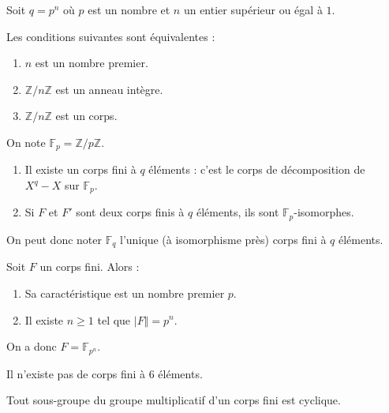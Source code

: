 	Soit $q = p^n$ où $p$ est un nombre et $n$ un entier supérieur ou égal à $1$.


	\begin{proposition}
		Les conditions suivantes sont équivalentes :
		\begin{enumerate}[label=(\roman*)]
			\item $n$ est un nombre premier.
			\item $\mathbb{Z}/n\mathbb{Z}$ est un anneau intègre.
			\item $\mathbb{Z}/n\mathbb{Z}$ est un corps.
		\end{enumerate}
	\end{proposition}

	\begin{notation}
		On note $\mathbb{F}_p = \mathbb{Z}/p\mathbb{Z}$.
	\end{notation}


	\begin{theorem}
		\begin{enumerate}[label=(\roman*)]
			\item Il existe un corps fini à $q$ éléments : c'est le corps de décomposition de $X^q - X$ sur $\mathbb{F}_p$.
			\item Si $F$ et $F'$ sont deux corps finis à $q$ éléments, ils sont $\mathbb{F}_p$-isomorphes.
		\end{enumerate}
		On peut donc noter $\mathbb{F}_q$ l'unique (à isomorphisme près) corps fini à $q$ éléments.
	\end{theorem}

	\reference{81}

	\begin{theorem}
		Soit $F$ un corps fini. Alors :
		\begin{enumerate}[label=(\roman*)]
			\item Sa caractéristique est un nombre premier $p$.
			\item Il existe $n \geq 1$ tel que $\vert F \Vert = p^n$.
		\end{enumerate}
		On a donc $F = \mathbb{F}_{p^n}$.
	\end{theorem}

	\begin{example}
		Il n'existe pas de corps fini à $6$ éléments.
	\end{example}

	\begin{theorem}
		Tout sous-groupe du groupe multiplicatif d'un corps fini est cyclique.
	\end{theorem}

